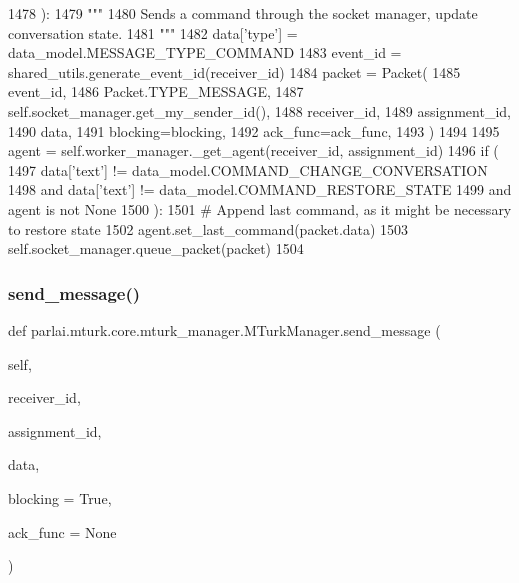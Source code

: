 \begin{DoxyCode}
1478     ):
1479         \textcolor{stringliteral}{"""}
1480 \textcolor{stringliteral}{        Sends a command through the socket manager, update conversation state.}
1481 \textcolor{stringliteral}{        """}
1482         data[\textcolor{stringliteral}{'type'}] = data\_model.MESSAGE\_TYPE\_COMMAND
1483         event\_id = shared\_utils.generate\_event\_id(receiver\_id)
1484         packet = Packet(
1485             event\_id,
1486             Packet.TYPE\_MESSAGE,
1487             self.socket\_manager.get\_my\_sender\_id(),
1488             receiver\_id,
1489             assignment\_id,
1490             data,
1491             blocking=blocking,
1492             ack\_func=ack\_func,
1493         )
1494 
1495         agent = self.worker\_manager.\_get\_agent(receiver\_id, assignment\_id)
1496         \textcolor{keywordflow}{if} (
1497             data[\textcolor{stringliteral}{'text'}] != data\_model.COMMAND\_CHANGE\_CONVERSATION
1498             \textcolor{keywordflow}{and} data[\textcolor{stringliteral}{'text'}] != data\_model.COMMAND\_RESTORE\_STATE
1499             \textcolor{keywordflow}{and} agent \textcolor{keywordflow}{is} \textcolor{keywordflow}{not} \textcolor{keywordtype}{None}
1500         ):
1501             \textcolor{comment}{# Append last command, as it might be necessary to restore state}
1502             agent.set\_last\_command(packet.data)
1503         self.socket\_manager.queue\_packet(packet)
1504 
\end{DoxyCode}
\mbox{\label{classparlai_1_1mturk_1_1core_1_1mturk__manager_1_1MTurkManager_a461d68a9cb665b1745442da16ba1584e}} 
\subsubsection{\texorpdfstring{send\+\_\+message()}{send\_message()}}
{\footnotesize\ttfamily def parlai.\+mturk.\+core.\+mturk\+\_\+manager.\+M\+Turk\+Manager.\+send\+\_\+message (\begin{DoxyParamCaption}\item[{}]{self,  }\item[{}]{receiver\+\_\+id,  }\item[{}]{assignment\+\_\+id,  }\item[{}]{data,  }\item[{}]{blocking = {\ttfamily True},  }\item[{}]{ack\+\_\+func = {\ttfamily None} }\end{DoxyParamCaption})}

